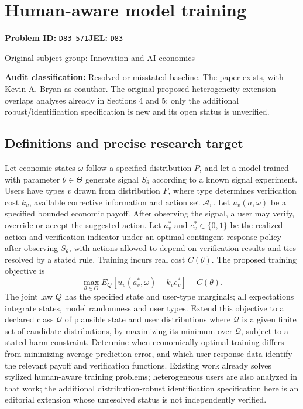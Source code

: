 \documentclass[11pt,a4paper]{article}
\begin{document}
\section*{Human-aware model training}
\textbf{Problem ID:} \texttt{D83-571}\quad \textbf{JEL:} \texttt{D83}\par
\label{problem:OP-0418}
{\sffamily\small\color{muted}Original subject group: Innovation and AI economics\par}
\label{definitions:problem:30007700}
\textbf{Audit classification:} Resolved or misstated baseline. The paper exists, with Kevin A. Bryan as coauthor. The original proposed heterogeneity extension overlaps analyses already in Sections 4 and 5; only the additional robust/identification specification is new and its open status is unverified.
\subsection*{Definitions and precise research target}
Let economic states \(\omega\) follow a specified distribution \(P\), and let a model trained with parameter \(\theta\in\Theta\) generate signal \(S_\theta\) according to a known signal experiment. Users have types \(v\) drawn from distribution \(F\), where type determines verification cost \(k_v\), available corrective information and action set \(\mathcal A_v\). Let \(u_v(a,\omega)\) be a specified bounded economic payoff. After observing the signal, a user may verify, override or accept the suggested action. Let \(a_v^\ast\) and \(e_v^\ast\in\{0,1\}\) be the realized action and verification indicator under an optimal contingent response policy after observing \(S_\theta\), with actions allowed to depend on verification results and ties resolved by a stated rule. Training incurs real cost \(C(\theta)\). The proposed training objective is
\[
\max_{\theta\in\Theta}E_Q[u_v(a_v^\ast,\omega)-k_v e_v^\ast]-C(\theta).
\]
The joint law \(Q\) has the specified state and user-type marginals; all expectations integrate states, model randomness and user types. Extend this objective to a declared class \(\mathcal Q\) of plausible state and user distributions where \(\mathcal Q\) is a given finite set of candidate distributions, by maximizing its minimum over \(\mathcal Q\), subject to a stated harm constraint. Determine when economically optimal training differs from minimizing average prediction error, and which user-response data identify the relevant payoff and verification functions. Existing work already solves stylized human-aware training problems; heterogeneous users are also analyzed in that work; the additional distribution-robust identification specification here is an editorial extension whose unresolved status is not independently verified.
\end{document}
